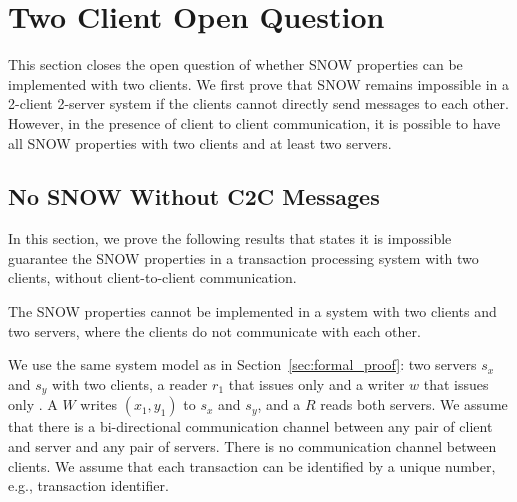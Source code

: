 \section{Two Client Open Question}
\label{sec:2c2s}
This section closes the open question of whether SNOW properties can be implemented with two clients. We first prove that SNOW remains impossible in a 2-client 2-server system if the clients cannot directly send messages to each other.
 However, in the presence of client to client communication, it is possible to have all SNOW properties with two clients and at least two servers.
 
 \subsection{No  SNOW Without C2C  Messages}
 \label{subsec:no_snow_no_c2c}
 
 
 In this section, we prove the following results that states it is impossible guarantee the SNOW properties in a transaction processing system with two clients, without client-to-client communication.
  \begin{theorem}\label{thm:two-snow}
  	The SNOW properties cannot be implemented in a system with two clients and two servers, where the clients do not communicate with each other.
  \end{theorem} 
 
 We use the same system model as in Section~\ref{sec:formal_proof}: two servers $s_x$ and $s_y$ with two clients, a reader $r_1$ that issues only 
\rots{} and a writer $w$ that issues only \wots{}. A \wot{} $W$ writes $(x_1, y_1)$ to $s_x$ and $s_y$, and a \rot{} $R$ reads both servers. We assume that there is a bi-directional communication channel between any pair of client and server and any pair of servers. There is no communication channel between clients. We assume that each transaction can be identified by a unique number, e.g., transaction identifier. 

